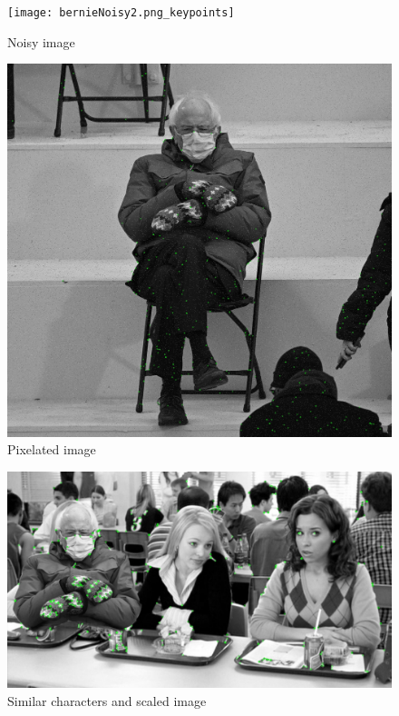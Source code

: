 \documentclass[12pt,a4paper]{report}
\begin{document}
\begin{figure}[hb]
	\centering
	\texttt{[image: bernieNoisy2.png\_keypoints]}
	\caption{Noisy image}
\end{figure}
\begin{figure}[hb]
	\centering
	\includegraphics[width=\textwidth]{berniePixelated2.png_keypoints}
	\caption{Pixelated image}
\end{figure}
\begin{figure}[hb]
	\centering
	\includegraphics[width=\textwidth]{bernieShoolLunch.jpeg_keypoints}
	\caption{Similar characters and scaled image}
\end{figure}
\end{document}
